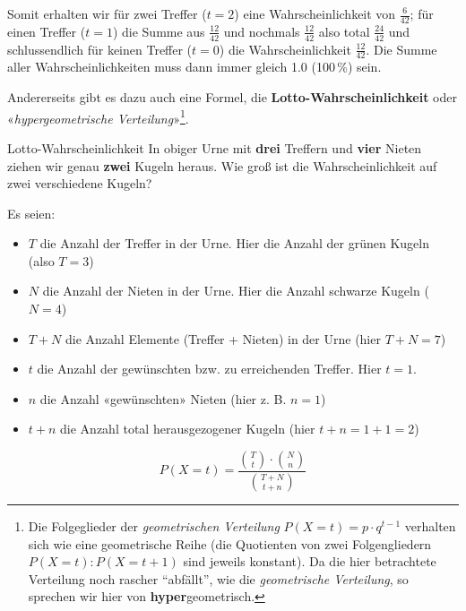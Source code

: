 
Somit erhalten wir für zwei Treffer ($t=2$) eine Wahrscheinlichkeit von $\frac{6}{42}$; für einen Treffer ($t=1$) die Summe aus $\frac{12}{42}$ und nochmals $\frac{12}{42}$ also total $\frac{24}{42}$ und schlussendlich für keinen Treffer ($t=0$) die Wahrscheinlichkeit $\frac{12}{42}$.
Die Summe aller Wahrscheinlichkeiten muss dann immer gleich 1.0 (100\,\%) sein.
\newpage

Andererseits gibt es dazu auch eine Formel, die
\textbf{Lotto-Wahrscheinlichkeit} oder «\textit{hypergeometrische
  Verteilung}»\footnote{Die Folgeglieder der \textit{geometrischen
    Verteilung} $P(X=t) = p\cdot{}q^{t-1}$ verhalten sich wie eine
  geometrische Reihe (die Quotienten von zwei Folgengliedern $P(X=t) :
  P(X=t+1)$ sind jeweils konstant). Da die hier betrachtete Verteilung
  noch rascher ``abfällt'', wie die \textit{geometrische Verteilung},
  so sprechen wir hier von \textbf{hyper}geometrisch.}.

\begin{beispiel}{Lotto-Wahrscheinlichkeit}{}
  In obiger Urne mit \textbf{drei} Treffern und \textbf{vier} Nieten
  ziehen wir genau \textbf{zwei} Kugeln heraus. Wie groß ist die
  Wahrscheinlichkeit auf zwei verschiedene Kugeln?
\end{beispiel}



Es seien:
\begin{itemize}
\item $T$ die Anzahl der Treffer in der Urne. Hier die Anzahl der grünen Kugeln (also $T = 3$)
\item $N$ die Anzahl der Nieten in der Urne. Hier die Anzahl schwarze Kugeln ($N=4$)
\item $T+N$ die Anzahl Elemente (Treffer + Nieten) in der Urne (hier $T+N = 7$)

\item $t$ die Anzahl der gewünschten bzw. zu erreichenden Treffer. Hier \zB $t=1$.
  
\item $n$ die Anzahl «gewünschten» Nieten (hier z. B. $n = 1$)
\item $t+n$ die Anzahl total herausgezogener Kugeln (hier $t+n=1+1=2$)
\end{itemize}

\newpage


\begin{gesetz}{}{}
$$P(X=t) = \frac{ {T\choose t} \cdot{} {{N}\choose {n}}}{{{T+N} \choose {t+n}}}$$
\end{gesetz}

